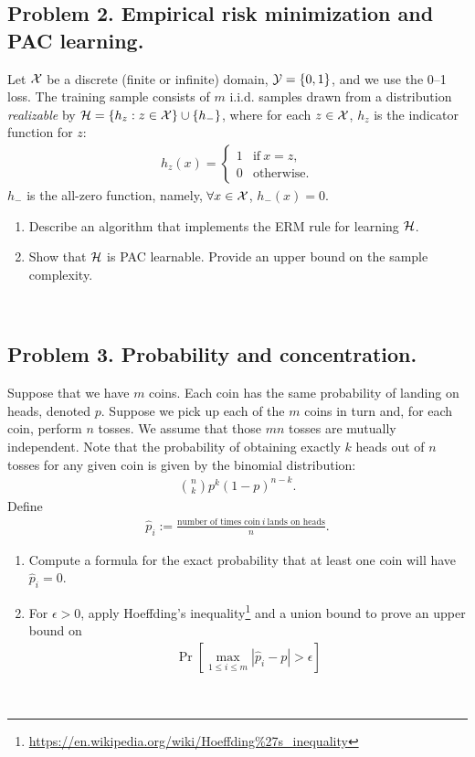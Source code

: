 \documentclass[12pt]{article}
\theoremstyle{plain}
\theoremstyle{definition}
\begin{document}
\subsection*{Problem 2. Empirical risk minimization and PAC learning.} 
Let ${\cal X}$ be a discrete (finite or infinite) domain, ${\cal Y}=\{0,1\}$, and we use the 0--1 loss. The training sample consists of $m$ i.i.d. samples drawn from a distribution \emph{realizable} by ${\cal H} = \{h_z:z \in {\cal X}\} \cup \{h_-\}$, where for each $z \in {\cal X}$, $h_z$ is the indicator function for $z$:
\begin{align*}
    h_z(x)=\begin{cases}
        1 & \text{if}~x=z,\\
        0 & \text{otherwise}.
    \end{cases}
\end{align*}
$h_-$ is the all-zero function, namely, $\forall x \in  {\cal X}$, $h_-(x) = 0$. 
\begin{enumerate}
    \item Describe an algorithm that implements the ERM rule for learning ${\cal H}$.
    \item Show that ${\cal H}$ is PAC learnable. Provide an upper bound on the sample complexity.
\end{enumerate}
\newline 
\   %
\newpage

\subsection*{Problem 3. Probability and concentration.} 
Suppose that we have $m$ coins. Each coin has the same probability of landing on heads, denoted $p$. Suppose we pick up each of the $m$ coins in turn and, for each coin, perform $n$ tosses. We assume that those $mn$ tosses are mutually independent. Note that the probability of obtaining exactly $k$ heads out of $n$ tosses for any given coin is given by the binomial distribution: 
\begin{align*}
    \binom{n}{k} p^{k} (1-p)^{n-k}.
\end{align*}
Define
\begin{align*}
    \hat{p}_i:=\frac{\text{number of times coin}~i~\text{lands on heads}}{n}.
\end{align*}
\begin{enumerate}
    \item Compute a formula for the exact probability that at least one coin will have $\hat{p}_i=0$.
    \item For $\epsilon >0$,  apply Hoeffding’s inequality\footnote{\url{https://en.wikipedia.org/wiki/Hoeffding\%27s_inequality}} and a union bound to prove an upper bound on
    \begin{align*}
        \Pr\left[\max_{1\leq i\leq m} |\hat{p}_i-p|>\epsilon\right]
    \end{align*}
\end{enumerate}
\newline 
\   %
\newpage
\end{document}
